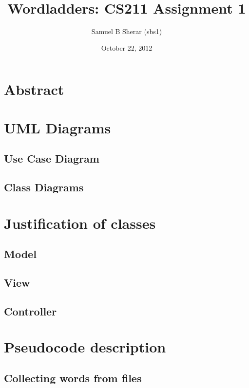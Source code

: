 \documentclass[10pt, a4paper]{article}
\begin{document}
\title{Wordladders: CS211 Assignment 1}
\date{October 22, 2012}
\author{Samuel B Sherar (sbs1)}

\maketitle
\newpage

\tableofcontents

\section{Abstract}

\section{UML Diagrams}

\subsection{Use Case Diagram}

\subsection{Class Diagrams}

\section{Justification of classes}

\subsection{Model}

\subsection{View}

\subsection{Controller}

\section{Pseudocode description}

\subsection{Collecting words from files}
\end{document}
